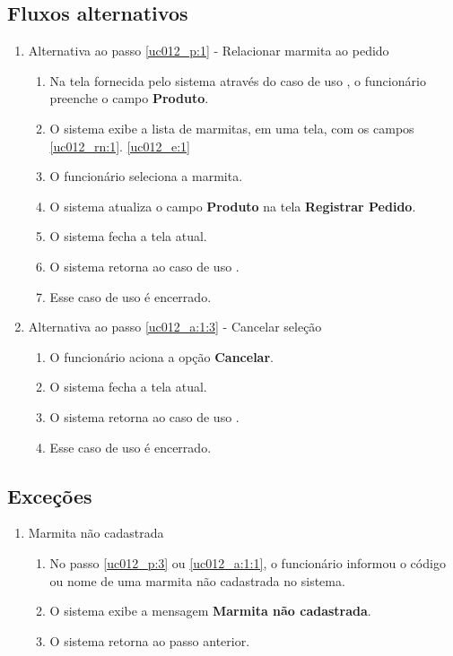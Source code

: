 \subsection{Fluxos alternativos}

\begin{enumerate}[label=A\arabic*]
	\item Alternativa ao passo \ref{uc012_p:1} - Relacionar marmita ao pedido \label{uc012_a:1}
	\begin{enumerate}[label*=.\arabic*]
		\item Na tela fornecida pelo sistema através do caso de uso , o funcionário preenche o campo \textbf{Produto}. \label{uc012_a:1:1}
		\item O sistema exibe a lista de marmitas, em uma tela, com os campos \ref{uc012_rn:1}. \ref{uc012_e:1}
		\item O funcionário seleciona a marmita. \label{uc012_a:1:3}
		\item O sistema atualiza o campo \textbf{Produto} na tela \textbf{Registrar Pedido}.
		\item O sistema fecha a tela atual.
		\item O sistema retorna ao caso de uso .
		\item Esse caso de uso é encerrado.
	\end{enumerate}
	
	\item Alternativa ao passo \ref{uc012_a:1:3} - Cancelar seleção
	\begin{enumerate}[label*=.\arabic*]
		\item O funcionário aciona a opção \textbf{Cancelar}.
		\item O sistema fecha a tela atual.
		\item O sistema retorna ao caso de uso .
		\item Esse caso de uso é encerrado.
	\end{enumerate}
\end{enumerate}

\subsection{Exceções}

\begin{enumerate}[label=E\arabic*]
	\item Marmita não cadastrada \label{uc012_e:1}
	\begin{enumerate}[label*=.\arabic*]
		\item[] No passo \ref{uc012_p:3} ou \ref{uc012_a:1:1}, o funcionário informou o código ou nome de uma marmita não cadastrada no sistema.
		\item O sistema exibe a mensagem \textbf{Marmita não cadastrada}.
		\item O sistema retorna ao passo anterior.
	\end{enumerate}
\end{enumerate}

